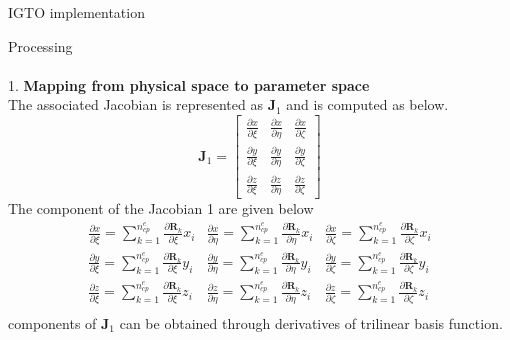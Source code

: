 \documentclass[a4paper,12pt,times]{article}
\begin{document}
\begin{section}{IGTO implementation}
\begin{subsection}{Processing}
\paragraph{}
1. \textbf{ Mapping from physical space to parameter space}
\\ The associated Jacobian is represented as $\mathbf{J}_{1}$ and is computed as below.
\begin{equation}
\mathbf{J}_{1}=\left[\begin{array}{lll}
\frac{\partial x}{\partial \xi} & \frac{\partial x}{\partial \eta} & \frac{\partial x}{\partial \zeta} \\
\frac{\partial y}{\partial \xi} & \frac{\partial y}{\partial \eta} & \frac{\partial y}{\partial \zeta} \\
\frac{\partial z}{\partial \xi} & \frac{\partial z}{\partial \eta} & \frac{\partial z}{\partial \zeta}
\end{array}\right]
\end{equation}
The component of the Jacobian 1 are given below
\begin{equation}\label{J1}
\begin{array}{lll}
\frac{\partial x}{\partial \xi}=\sum_{k=1}^{n_{c p}^{e}} \frac{\partial \mathbf{R}_{k}}{\partial \xi} x_{i} & \frac{\partial x}{\partial \eta}=\sum_{k=1}^{n_{c p}^{e}} \frac{\partial \mathbf{R}_{k}}{\partial \eta} x_{i} & \frac{\partial x}{\partial \zeta}=\sum_{k=1}^{n_{c p}^{e}} \frac{\partial \mathbf{R}_{k}}{\partial \zeta} x_{i} \\
\frac{\partial y}{\partial \xi}=\sum_{k=1}^{n_{c p}^{e}} \frac{\partial \mathbf{R}_{k}}{\partial \xi} y_{i} & \frac{\partial y}{\partial \eta}=\sum_{k=1}^{n_{c p}^{e}} \frac{\partial \mathbf{R}_{k}}{\partial \eta} y_{i} &\frac{\partial y}{\partial \zeta}=\sum_{k=1}^{n_{c p}^{e}} \frac{\partial \mathbf{R}_{k}}{\partial \zeta} y_{i}\\
\frac{\partial z}{\partial \xi}=\sum_{k=1}^{n_{c p}^{e}} \frac{\partial \mathbf{R}_{k}}{\partial \xi} z_{i} & \frac{\partial z}{\partial \eta}=\sum_{k=1}^{n_{c p}^{e}} \frac{\partial \mathbf{R}_{k}}{\partial \eta} z_{i} &\frac{\partial z}{\partial \zeta}=\sum_{k=1}^{n_{c p}^{e}} \frac{\partial \mathbf{R}_{k}}{\partial \zeta} z_{i}\\
\end{array}
\end{equation}
components of $\mathbf{J}_{1}$ can be obtained through derivatives of trilinear basis function. 


\end{subsection}
\end{section}
\end{document}

